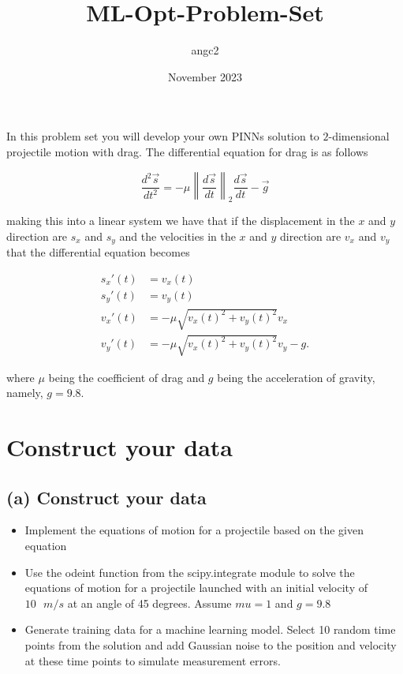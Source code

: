 \documentclass{article}
\title{ML-Opt-Problem-Set}
\author{angc2 }
\date{November 2023}
\begin{document}
\maketitle

\maketitle

In this problem set you will develop your own PINNs solution to $2$-dimensional projectile motion with drag. The differential equation for drag is as follows

$$\frac{d^2 \Vec{s}}{dt^2} = - \mu \left \lVert 
\frac{d \Vec{s}}{dt} \right\rVert_2 \frac{d \Vec{s}}{dt} - \Vec{g}$$

making this into a linear system we have that if the displacement in the $x$ and $y$ direction are $s_x$ and $s_y$ and the velocities in the $x$ and $y$ direction are $v_x$ and $v_y$ that the differential equation becomes

\begin{align}
    s_x'(t) &= v_x(t)\\
    s_y'(t) &= v_y(t)\\
    v_x'(t) &= -\mu \sqrt{v_x(t)^2 + v_y(t)^2} v_x\\
    v_y'(t) &= -\mu \sqrt{v_x(t)^2 + v_y(t)^2} v_y - g.
\end{align}

where $\mu$ being the coefficient of drag and $g$ being the acceleration of gravity, namely, $g = 9.8$.

\section{Construct your data}

\subsection{(a) Construct your data}

\begin{itemize}
    \item Implement the equations of motion for a projectile based on the given equation
    \item Use the odeint function from the scipy.integrate module to solve the equations of motion for a projectile launched with an initial velocity of $10\text{ } m/s$ at an angle of 45 degrees. Assume $mu = 1$ and $g = 9.8$
    \item Generate training data for a machine learning model. Select 10 random time points from the solution and add Gaussian noise to the position and velocity at these time points to simulate measurement errors.
\end{itemize}
\end{document}
